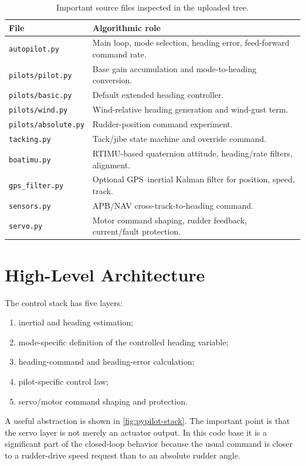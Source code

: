 \documentclass[10pt,twocolumn]{article}
\begin{document}
\begin{table}[!tbp]
\centering
\caption{Important source files inspected in the uploaded tree.}
\label{tab:source-files}
\begin{tabularx}{\columnwidth}{@{}Z{0.34\columnwidth}Y@{}}
\toprule
File & Algorithmic role \\
\midrule
\texttt{autopilot.py} & Main loop, mode selection, heading error, feed-forward command rate. \\
\texttt{pilots/pilot.py} & Base gain accumulation and mode-to-heading conversion. \\
\texttt{pilots/basic.py} & Default extended heading controller. \\
\texttt{pilots/wind.py} & Wind-relative heading generation and wind-gust term. \\
\texttt{pilots/absolute.py} & Rudder-position command experiment. \\
\texttt{tacking.py} & Tack/jibe state machine and override command. \\
\texttt{boatimu.py} & RTIMU-based quaternion attitude, heading/rate filters, alignment. \\
\texttt{gps\_filter.py} & Optional GPS--inertial Kalman filter for position, speed, track. \\
\texttt{sensors.py} & APB/NAV cross-track-to-heading command. \\
\texttt{servo.py} & Motor command shaping, rudder feedback, current/fault protection. \\
\bottomrule
\end{tabularx}
\end{table}

\section{High-Level Architecture}

The control stack has five layers:
\begin{enumerate}
\item inertial and heading estimation;
\item mode-specific definition of the controlled heading variable;
\item heading-command and heading-error calculation;
\item pilot-specific control law;
\item servo/motor command shaping and protection.
\end{enumerate}

A useful abstraction is shown in \cref{fig:pypilot-stack}.  The important point is that
the servo layer is not merely an actuator output.  In this code base it is a significant
part of the closed-loop behavior because the usual command is closer to a rudder-drive
speed request than to an absolute rudder angle.
\end{document}

